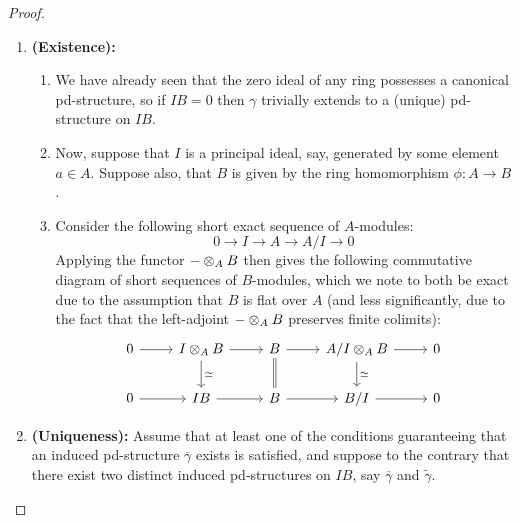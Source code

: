                 \begin{proof}
                    \noindent
                    \begin{enumerate}
                        \item \textbf{(Existence):} 
                            \noindent
                            \begin{enumerate}
                                \item We have already seen that the zero ideal of any ring possesses a canonical pd-structure, so if $IB = 0$ then $\gamma$ trivially extends to a (unique) pd-structure on $IB$.
                                \item Now, suppose that $I$ is a principal ideal, say, generated by some element $a \in A$. Suppose also, that $B$ is given by the ring homomorphism $\phi: A \to B$.
                                \item Consider the following short exact sequence of $A$-modules:
                                    $$0 \to I \to A \to A/I \to 0$$
                                Applying the functor $- \tensor_A B$ then gives the following commutative diagram of short sequences of $B$-modules, which we note to both be exact due to the assumption that $B$ is flat over $A$ (and less significantly, due to the fact that the left-adjoint $- \tensor_A B$ preserves finite colimits):
                                    $$
                                        \begin{tikzcd}
                                        	{0} & {I \tensor_A B} & {B} & {A/I \tensor_A B} & {0} \\
                                        	{0} & {IB} & {B} & {B/I} & {0}
                                        	\arrow["{\cong}", from=1-2, to=2-2]
                                        	\arrow[Rightarrow, from=1-3, to=2-3, no head]
                                        	\arrow["{\cong}", from=1-4, to=2-4]
                                        	\arrow[from=1-2, to=1-3]
                                        	\arrow[from=1-3, to=1-4]
                                        	\arrow[from=2-2, to=2-3]
                                        	\arrow[from=2-3, to=2-4]
                                        	\arrow[from=2-4, to=2-5]
                                        	\arrow[from=1-4, to=1-5]
                                        	\arrow[from=1-1, to=1-2]
                                        	\arrow[from=2-1, to=2-2]
                                        \end{tikzcd}
                                    $$
                                
                            \end{enumerate}
                        \item \textbf{(Uniqueness):} Assume that at least one of the conditions guaranteeing that an induced pd-structure $\overline{\gamma}$ exists is satisfied, and suppose to the contrary that there exist two distinct induced pd-structures on $IB$, say $\overline{\gamma}$ and $\tilde{\gamma}$.
                    \end{enumerate}
                \end{proof}
                
